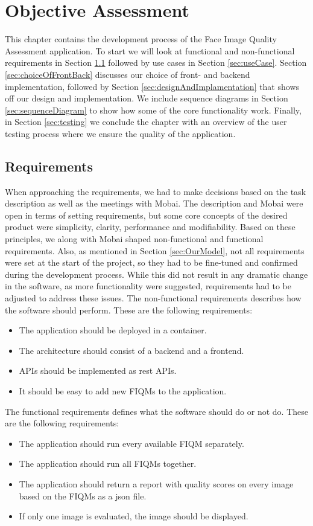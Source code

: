 \chapter{Objective Assessment}
\label{chap:objective}
This chapter contains the development process of the Face Image Quality Assessment application. To start we will look at functional and non-functional requirements in Section \ref{sec:requirements} followed by use cases in Section \ref{sec:useCase}. Section \ref{sec:choiceOfFrontBack} discusses our choice of front- and backend implementation, followed by Section \ref{sec:designAndImplamentation} that shows off our design and implementation. We include sequence diagrams in Section \ref{sec:sequenceDiagram} to show how some of the core functionality work. Finally, in Section \ref{sec:testing} we conclude the chapter with an overview of the user testing process where we ensure the quality of the application.

\section{Requirements}
\label{sec:requirements}
When approaching the requirements, we had to make decisions based on the task description as well as the meetings with Mobai. The description and Mobai were open in terms of setting requirements, but some core concepts of the desired product were simplicity, clarity, performance and modifiability. Based on these principles, we along with Mobai shaped non-functional and functional requirements. Also, as mentioned in Section \ref{sec:OurModel}, not all requirements were set at the start of the project, so they had to be fine-tuned and confirmed during the development process. While this did not result in any dramatic change in the software, as more functionality were suggested, requirements had to be adjusted to address these issues. The non-functional requirements describes how the software should perform. These are the following requirements:
\begin{itemize}
    \item The application should be deployed in a container.
    \item The architecture should consist of a backend and a frontend.
    \item APIs should be implemented as \acrshort{rest} APIs.
    \item It should be easy to add new FIQMs to the application.
\end{itemize}
The functional requirements defines what the software should do or not do. These are the following requirements:
\begin{itemize}
    \item The application should run every available FIQM separately.
    \item The application should run all FIQMs together.
    \item The application should return a report with quality scores on every image based on the FIQMs as a \acrshort{json} file.
    \item If only one image is evaluated, the image should be displayed. 
\end{itemize}

